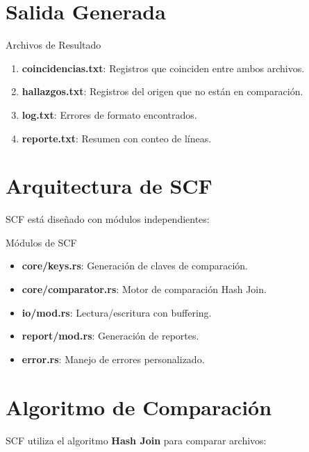 \section{Salida Generada}

\begin{caja}{Archivos de Resultado}
\begin{enumerate}
\item \textbf{coincidencias.txt}: Registros que coinciden entre ambos archivos.
\item \textbf{hallazgos.txt}: Registros del origen que no están en comparación.
\item \textbf{log.txt}: Errores de formato encontrados.
\item \textbf{reporte.txt}: Resumen con conteo de líneas.
\end{enumerate}
\end{caja}


\section{Arquitectura de SCF}

SCF está diseñado con módulos independientes:

\begin{caja}{Módulos de SCF}
\begin{itemize}
\item \textbf{core/keys.rs}: Generación de claves de comparación.
\item \textbf{core/comparator.rs}: Motor de comparación Hash Join.
\item \textbf{io/mod.rs}: Lectura/escritura con buffering.
\item \textbf{report/mod.rs}: Generación de reportes.
\item \textbf{error.rs}: Manejo de errores personalizado.
\end{itemize}
\end{caja}


\section{Algoritmo de Comparación}

SCF utiliza el algoritmo \textbf{Hash Join} para comparar archivos:

